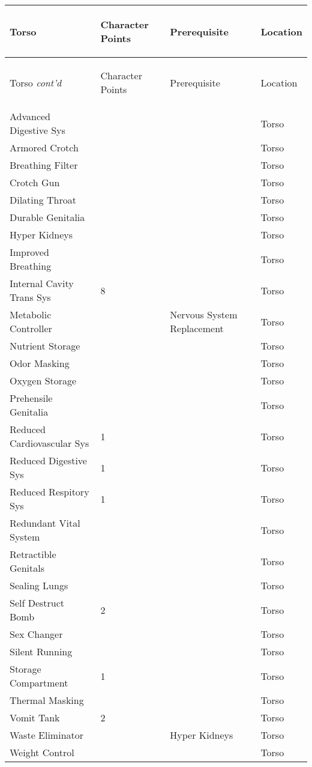\documentclass[twoside]{book}
\begin{document}
\begin{longtable}{p{1.25in}p{2em}ll} 
  Torso& \begin{turn}{70}{Character Points}\end{turn}
          & \begin{turn}{70}{Prerequisite}\end{turn}
          & \begin{turn}{70}{Location}\end{turn}
          \\
  \hline
  \hline
  \endfirsthead
  Torso \textit{cont'd}
        & \begin{turn}{70}{Character Points}\end{turn}
          & \begin{turn}{70}{Prerequisite}\end{turn}
          & \begin{turn}{70}{Location}\end{turn}
           \\
  \hline
  \endhead
\raggedright Advanced Digestive Sys&&&Torso\tabularnewline
      \raggedright Armored Crotch&&&Torso\tabularnewline
      \raggedright Breathing Filter&&&Torso\tabularnewline
      \raggedright Crotch Gun&&&Torso\tabularnewline
      \raggedright Dilating Throat&&&Torso\tabularnewline
      \raggedright Durable Genitalia&&&Torso\tabularnewline
      \raggedright Hyper Kidneys&&&Torso\tabularnewline
      \raggedright Improved Breathing&&&Torso\tabularnewline
      \raggedright Internal Cavity Trans Sys&8&&Torso\tabularnewline
      \raggedright Metabolic Controller&&Nervous System Replacement&Torso\tabularnewline
      \raggedright Nutrient Storage&&&Torso\tabularnewline
      \raggedright Odor Masking&&&Torso\tabularnewline
      \raggedright Oxygen Storage&&&Torso\tabularnewline
      \raggedright Prehensile Genitalia&&&Torso\tabularnewline
      \raggedright Reduced Cardiovascular Sys&1&&Torso\tabularnewline
      \raggedright Reduced Digestive Sys&1&&Torso\tabularnewline
      \raggedright Reduced Respitory Sys&1&&Torso\tabularnewline
      \raggedright Redundant Vital System&&&Torso\tabularnewline
      \raggedright Retractible Genitals&&&Torso\tabularnewline
      \raggedright Sealing Lungs&&&Torso\tabularnewline
      \raggedright Self Destruct Bomb&2&&Torso\tabularnewline
      \raggedright Sex Changer&&&Torso\tabularnewline
      \raggedright Silent Running&&&Torso\tabularnewline
      \raggedright Storage Compartment&1&&Torso\tabularnewline
      \raggedright Thermal Masking&&&Torso\tabularnewline
      \raggedright Vomit Tank&2&&Torso\tabularnewline
      \raggedright Waste Eliminator&&Hyper Kidneys&Torso\tabularnewline
      \raggedright Weight Control&&&Torso\tabularnewline
      
\end{longtable}
    
\end{document}
